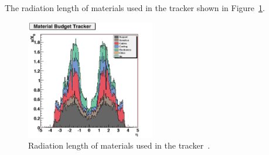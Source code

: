 The radiation length of materials used in the tracker shown in Figure~\ref{fig:tracker_radiation_length.}.

\begin{figure}[h]
\centering
\includegraphics[width=0.5\textwidth]{figures/tracker_radiation_length_XoverX0.png}
\caption{Radiation length of materials used in the tracker~\cite{CMSExperiment}.}
\label{fig:tracker_radiation_length.}
\end{figure}


